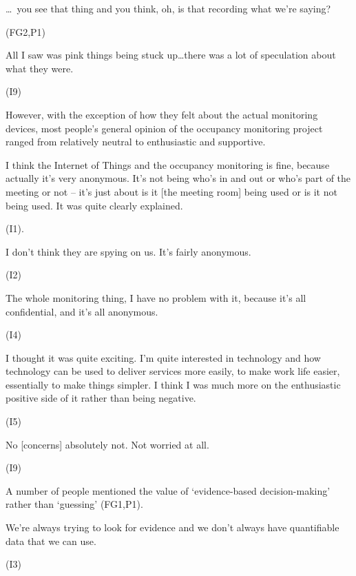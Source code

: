 \begin{qt}\ldots\  you see that thing and you think, oh, is that
recording what we’re saying?\end{qt} (FG2,P1)

\begin{qt}All I saw was pink things being stuck up…there was a lot of speculation about what they were.\end{qt} (I9)

However, with the exception of how they felt about the actual
monitoring devices, most people’s general opinion of the occupancy
monitoring project ranged from relatively neutral to enthusiastic and
supportive.

\begin{qt}I think the Internet of Things and the occupancy monitoring is fine,
because actually it’s very anonymous. It’s not being who’s in and out
or who’s part of the meeting or not – it’s just about is it [the meeting room] being used
or is it not being used. It was quite clearly explained.\end{qt}
(I1).

\begin{qt}I don’t think they are spying on us. It’s fairly anonymous.\end{qt} (I2)

\begin{qt}The whole monitoring thing, I have no problem with it, because it’s
all confidential, and it’s all anonymous.\end{qt} (I4)

\begin{qt}I thought it was quite exciting. I’m quite interested in technology
and how technology can be used to deliver services more easily, to
make work life easier, essentially to make things simpler. I think I
was much more on the enthusiastic positive side of it rather than
being negative.\end{qt} (I5)

\begin{qt}No [concerns] absolutely not. Not worried at all.\end{qt} (I9)

A number of people mentioned the value of ‘evidence-based decision-making’ rather than ‘guessing’ (FG1,P1).

\begin{qt}We’re always trying to look for evidence and
we don’t always have quantifiable data that we can use.\end{qt} (I3)

